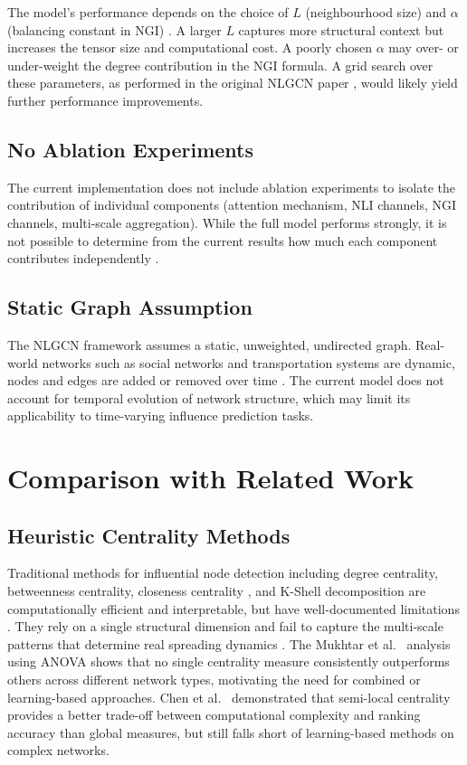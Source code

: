 The model's performance depends on the choice of $L$ (neighbourhood
size) and $\alpha$ (balancing constant in NGI) \cite{guo2026}.
A larger $L$ captures more structural context but increases the
tensor size and computational cost. A poorly chosen $\alpha$ may
over- or under-weight the degree contribution in the NGI formula.
A grid search over these parameters, as performed in the original
NLGCN paper \cite{guo2026}, would likely yield further performance
improvements.


\subsection{No Ablation Experiments}

The current implementation does not include ablation experiments
to isolate the contribution of individual components
(attention mechanism, NLI channels, NGI channels, multi-scale
aggregation). While the full model performs strongly, it is not
possible to determine from the current results how much each
component contributes independently \cite{guo2026, tu2025}.

\subsection{Static Graph Assumption}

The NLGCN framework assumes a static, unweighted, undirected graph.
Real-world networks such as social networks and transportation
systems are dynamic, nodes and edges are added or removed over
time \cite{hafiene2020}. The current model does not account for
temporal evolution of network structure, which may limit its
applicability to time-varying influence prediction tasks.

\section{Comparison with Related Work}

\subsection{Heuristic Centrality Methods}

Traditional methods for influential node detection including
degree centrality, betweenness centrality,
closeness centrality , and K-Shell decomposition are computationally efficient and interpretable,
but have well-documented limitations \cite{chen2012, mukhtar}.
They rely on a single structural dimension and fail to capture the
multi-scale patterns that determine real spreading dynamics
\cite{guo2026, thotakura2024}. The Mukhtar et al.\ \cite{mukhtar}
analysis using ANOVA shows that no single centrality measure
consistently outperforms others across different network types,
motivating the need for combined or learning-based approaches.
Chen et al.\ \cite{chen2012} demonstrated that semi-local
centrality provides a better trade-off between computational
complexity and ranking accuracy than global measures, but still
falls short of learning-based methods on complex networks.

